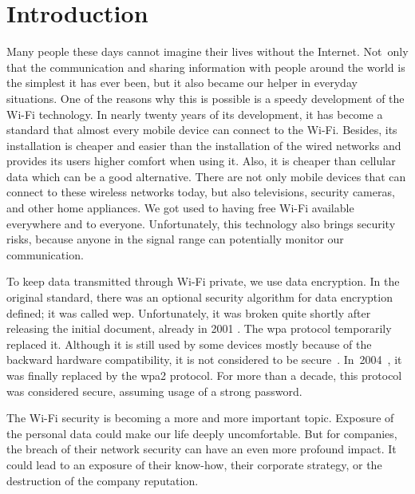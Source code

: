 \chapter{Introduction}

Many people these days cannot imagine their lives without the Internet. Not~only that the communication and sharing information with people around the world is the simplest it has ever been, but it also became our helper in everyday situations. One of the reasons why this is possible is a speedy development of the Wi-Fi technology. In nearly twenty years of its development, it has become a standard that almost every mobile device can connect to the Wi-Fi. Besides, its installation is cheaper and easier than the installation of the wired networks and provides its users higher comfort when using it. Also, it is cheaper than cellular data which can be a good alternative. There are not only mobile devices that can connect to these wireless networks today, but also televisions, security cameras, and other home appliances. We got used to having free Wi-Fi available everywhere and to everyone. Unfortunately, this technology also brings security risks, because anyone in the signal range can potentially monitor our communication. 

To keep data transmitted through Wi-Fi private, we use data encryption. In the original standard, there was an optional security algorithm for data encryption defined; it was called \gls{wep}. Unfortunately, it was broken quite shortly after releasing the initial document, already in 2001 \cite{Cam-Winget03, finalNailWEP, MEKHAZNIA_2015}. The \gls{wpa} protocol temporarily replaced it. Although it is still used by some devices mostly because of the backward hardware compatibility, it is not considered to be secure~\cite{finalNailWEP}. In~2004~\cite{ieee802.11i_2004}, it was finally replaced by the \gls{wpa2} protocol. For more than a decade, this protocol was considered secure, assuming usage of a strong password.

The Wi-Fi security is becoming a more and more important topic. Exposure of the personal data could make our life deeply uncomfortable. But for companies, the breach of their network security can have an even more profound impact. It could lead to an exposure of their know-how, their corporate strategy, or the destruction of the company reputation.


